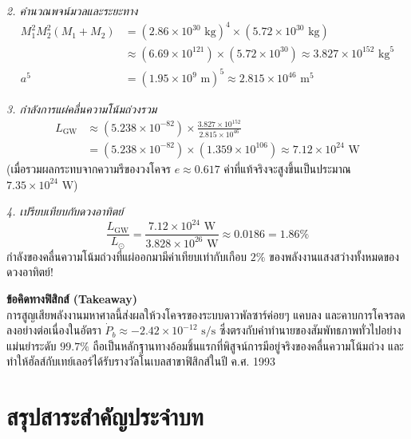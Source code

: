\begin{psctexample}
\textit{2. คำนวณพจน์มวลและระยะทาง}
\begin{align}
M_1^2 M_2^2 (M_1 + M_2) &= (2.86 \times 10^{30}\text{ kg})^4 \times (5.72 \times 10^{30}\text{ kg}) \nonumber \\
&\approx (6.69 \times 10^{121}) \times (5.72 \times 10^{30}) \approx 3.827 \times 10^{152}\text{ kg}^5 \nonumber \\
a^5 &= (1.95 \times 10^9\text{ m})^5 \approx 2.815 \times 10^{46}\text{ m}^5
\end{align}

\textit{3. กำลังการแผ่คลื่นความโน้มถ่วงรวม}
\begin{align}
L_{\text{GW}} &\approx (5.238 \times 10^{-82}) \times \frac{3.827 \times 10^{152}}{2.815 \times 10^{46}} \nonumber \\
&= (5.238 \times 10^{-82}) \times (1.359 \times 10^{106}) \approx 7.12 \times 10^{24}\text{ W}
\end{align}
(เมื่อรวมผลกระทบจากความรีของวงโคจร $e \approx 0.617$ ค่าที่แท้จริงจะสูงขึ้นเป็นประมาณ $7.35 \times 10^{24}\text{ W}$)

\textit{4. เปรียบเทียบกับดวงอาทิตย์}
\begin{equation}
\frac{L_{\text{GW}}}{L_\odot} = \frac{7.12 \times 10^{24}\text{ W}}{3.828 \times 10^{26}\text{ W}} \approx 0.0186 = 1.86\%
\end{equation}
กำลังของคลื่นความโน้มถ่วงที่แผ่ออกมามีค่าเทียบเท่ากับเกือบ $2\%$ ของพลังงานแสงสว่างทั้งหมดของดวงอาทิตย์!

\textbf{ข้อคิดทางฟิสิกส์ (Takeaway)} \\
การสูญเสียพลังงานมหาศาลนี้ส่งผลให้วงโคจรของระบบดาวพัลซาร์ค่อยๆ แคบลง และคาบการโคจรลดลงอย่างต่อเนื่องในอัตรา $\dot{P}_b \approx -2.42 \times 10^{-12}\text{ s/s}$ ซึ่งตรงกับคำทำนายของสัมพัทธภาพทั่วไปอย่างแม่นยำระดับ $99.7\%$ ถือเป็นหลักฐานทางอ้อมชิ้นแรกที่พิสูจน์การมีอยู่จริงของคลื่นความโน้มถ่วง และทำให้ฮัลส์กับเทย์เลอร์ได้รับรางวัลโนเบลสาขาฟิสิกส์ในปี ค.ศ. 1993
\qedexam
\end{psctexample}

\section{สรุปสาระสำคัญประจำบท}

